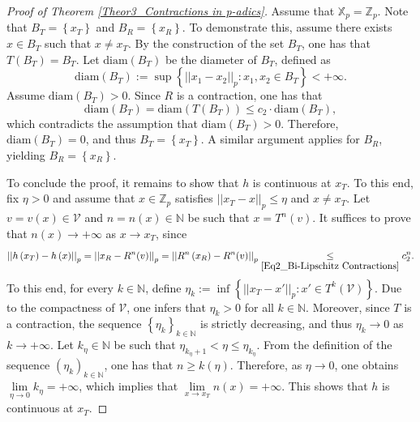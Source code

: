 \documentclass[10pt,a4paper]{amsart}
\begin{document}
\begin{proof}[Proof of Theorem \ref{Theor3_Contractions in p-adics}]
		Assume that $\mathbb{X}_{p} = \mathbb{Z}_{p}$. 
		Note that $B_{T} =  \left\{  x_{T}  \right\} $ and $B_{R} =  \left\{  x_{R}  \right\} $. To demonstrate this, assume there exists $x \in B_{T}$ such that $x \neq x_{T}$. By the construction of the set $B_{T}$, one has that $T \left(  B_{T}  \right)  = B_{T}$. Let $\textrm{diam} \left(  B_{T}  \right) $ be the diameter of $ B_{T}$, defined as   
		$$ \textrm{diam} \left(  B_{T}  \right)  :=   \sup \left\{   \left| \left|  x_{1} - x_{2}  \right|  \right|_{p} :   x_{1}, x_{2} \in B_{T}  \right\}    <   + \infty  .$$
		Assume $\textrm{diam} \left(  B_{T}  \right)   > 0$. Since $R$ is a contraction, one has that 
		$$ \textrm{diam} \left(  B_{T}  \right)    =   \textrm{diam} \left(  T \left(  B_{T}  \right)   \right)     \le   c_{2} \cdot \textrm{diam} \left(  B_{T}  \right)  ,$$
		which contradicts the assumption that $\textrm{diam} \left(  B_{T}  \right)   > 0$. Therefore, $\textrm{diam} \left(  B_{T}  \right)  =0$, and thus $ B_{T}  =  \left\{  x_{T}  \right\} $. 
		A similar argument applies for $B_{R}$, yielding $B_{R} =  \left\{  x_{R}  \right\} $. 
		
		
		To conclude the proof, it remains to show that $h$ is continuous at $x_{T}$. 
		To this end, fix $ \eta  > 0$ and assume that $x \in \mathbb{Z}_{p}$ satisfies $ \left| \left|  x_{T} - x  \right|  \right|_{p} \le  \eta $ and $x \neq x_{T}$. Let $v = v \left(  x  \right)  \in \mathcal{V} $ and $n = n \left(  x  \right)  \in \mathbb{N} $ be such that $x = T^{n}(v)$. 
		It suffices to prove that $n \left(  x  \right)  \to + \infty $ as $x \to x_{T}$, since
		\begin{equation}\label{Eq2_Fixed Point Continuity}
			\left| \left|  h \left(  x_{T}  \right)  - h \left(  x  \right)   \right|  \right|_{p}   =    \left| \left|  x_{R} - R^{n}(v)  \right|  \right|_{p}    =    \left| \left|  R^{n} \left(  x_{R}  \right)  - R^{n}(v)  \right|  \right|_{p}   \underset{\eqref{Eq2_Bi-Lipschitz Contractions}}{\le}   c_{2}^{n} . 
		\end{equation}
		To this end, for every $k \in \mathbb{N} $, define $\eta_{k} := \inf  \left\{   \left| \left|  x_{T} - x'  \right|  \right|_{p} :   x' \in T^{k} \left(  \mathcal{V}  \right)   \right\} $.
		Due to the compactness of $\mathcal{V}$, one infers that $\eta_{k}  > 0$ for all $k \in \mathbb{N} $.
		Moreover, since $T$ is a contraction, the sequence $ \left\{  \eta_{k}  \right\}_{k \in  \mathbb{N} }$ is strictly decreasing, and thus $\eta_{k} {\longrightarrow} 0$ as $k \to + \infty $. 
		Let $k_{ \eta} \in \mathbb{N} $ be such that $\eta_{k_{ \eta} + 1}  <  \eta \le \eta_{k_{ \eta}} $. From the definition of the sequence $ \left(  \eta_{k}   \right)_{k \in  \mathbb{N} }$, one has that $n \ge k \left(   \eta  \right)  $. 
		Therefore, as $ \eta \to 0$, one obtains $\underset{ \eta \to 0}{\lim} k_{ \eta} = + \infty $, which implies that $\underset{ x \to x_{T} }{\lim} n(x) = + \infty $. 
		This shows that $h$ is continuous at $x_{T}$. 
		

\end{proof}
\end{document}
